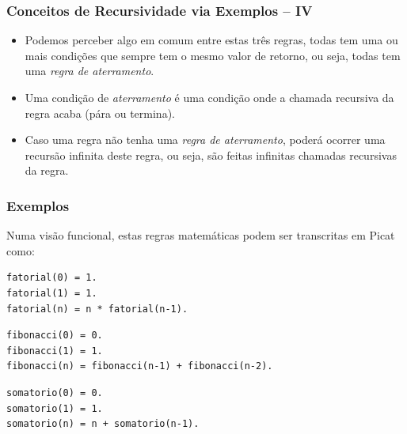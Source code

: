 \begin{frame}[fragile]

\frametitle{Conceitos de Recursividade via Exemplos -- IV}

  \begin{itemize}
      
      \item Podemos perceber algo em comum entre estas três regras, todas tem uma ou mais
      condições que sempre tem o mesmo valor de retorno, ou seja, todas tem uma \textit{regra de  aterramento}.
      
      \pause
      \item Uma condição de \textit{aterramento} é uma condição onde a chamada recursiva da regra
      acaba (pára ou termina).
      
       \pause
      \item Caso uma regra não tenha uma \textit{regra de aterramento}, poderá ocorrer uma recursão infinita deste regra, ou seja, são feitas infinitas chamadas recursivas
      da regra.
  \end{itemize}

\end{frame}

\begin{frame}[fragile]

\frametitle{Exemplos}

Numa visão funcional, estas regras matemáticas podem ser transcritas em Picat como:

    \begin{lstlisting}[frame=single]
fatorial(0) = 1.
fatorial(1) = 1.
fatorial(n) = n * fatorial(n-1).
    \end{lstlisting}

    \begin{lstlisting}[frame=single]
fibonacci(0) = 0.
fibonacci(1) = 1.
fibonacci(n) = fibonacci(n-1) + fibonacci(n-2).
    \end{lstlisting}

    \begin{lstlisting}[frame=single]
somatorio(0) = 0.
somatorio(1) = 1.
somatorio(n) = n + somatorio(n-1).
    \end{lstlisting}

\end{frame}


